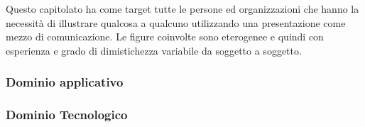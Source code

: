 Questo capitolato ha come target tutte le persone ed organizzazioni che hanno la necessità di illustrare qualcosa a qualcuno utilizzando una presentazione come mezzo di comunicazione.
Le figure coinvolte sono eterogenee e quindi con esperienza e grado di dimistichezza variabile da soggetto a soggetto. 

\subsubsection{Dominio applicativo}


\subsubsection{Dominio Tecnologico}

